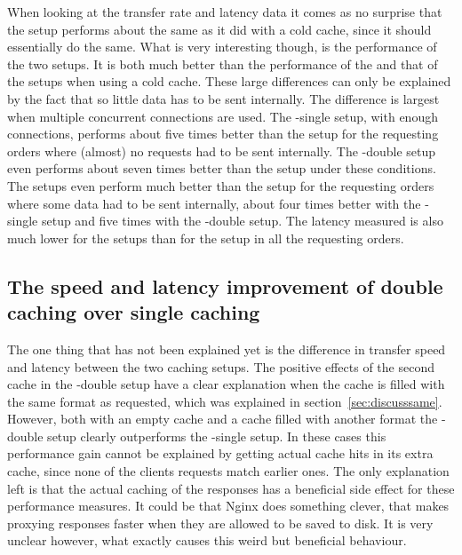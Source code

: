 \documentclass[twoside,openright]{uva-bachelor-thesis}
\begin{document}
When looking at the transfer rate and latency data it comes as no surprise that
the \cdn setup performs about the same as it did with a cold cache, since it
should essentially do the same. What is very interesting though, is the
performance of the two \lt setups. It is both much better than the performance
of the \cdn and that of the setups when using a cold cache.
These large differences can only be explained by the fact that so
little data has to be sent internally. The difference is largest when multiple
concurrent connections are used. The \lt-single setup, with enough connections,
performs about five times better than the \cdn setup for the requesting orders
where (almost) no requests had to be sent internally.
The \lt-double setup even performs about seven times better than the \cdn setup
under these conditions. The \lt setups even perform much better than the \cdn
setup for the requesting orders where some data had to be sent internally,
about four times better with the \lt-single setup and five times with the
\lt-double setup. The latency measured is also much lower for the \lt setups
than for the \cdn setup in all the requesting orders.


\subsection{The speed and latency improvement of double caching over single
caching}\label{sec:weirdstuff}
The one thing that has not been explained yet is the difference in transfer
speed and latency between the two caching \lt setups. The positive effects of
the second cache in the \lt-double setup have a clear explanation when the cache
is filled with the same format as requested, which was explained in
section~\ref{sec:discusssame}. However, both with an empty cache and a cache
filled with another format the \lt-double setup clearly outperforms the
\lt-single setup. In these cases this performance gain cannot be explained by
getting actual cache hits in its extra cache, since none of the clients requests
match earlier ones. The only explanation left is that the actual caching of the
responses has a beneficial side effect for these performance measures. It could
be that Nginx does something clever, that makes proxying responses faster when
they are allowed to be saved to disk. It is very unclear however, what exactly
causes this weird but beneficial behaviour.
\end{document}
